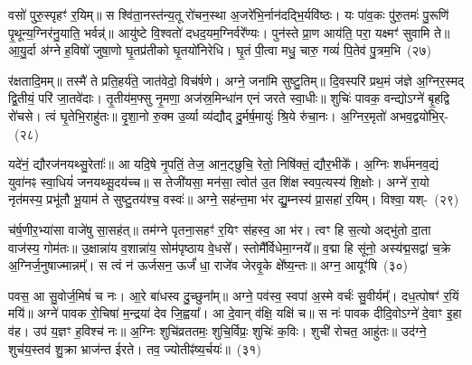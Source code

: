वसो॑ पुरु॒स्पृहꣳ॑ र॒यिम्॥ स श्वि॑ता॒नस्त॑न्य॒तू रो॑चन॒स्था अ॒जरे॑भि॒र्नान॑दद्भि॒र्यवि॑ष्ठः। यः पा॑व॒कः पु॑रु॒तमः॑ पु॒रूणि॑ पृ॒थून्य॒ग्निर॑नु॒याति॒ भर्वन्न्॑॥ आयु॑ष्टे वि॒श्वतो॑ दधद॒यम॒ग्निर्वरे᳚ण्यः। पुन॑स्ते प्रा॒ण आय॑ति॒ परा॒ यक्ष्मꣳ॑ सुवामि ते॥ आ॒यु॒र्दा अ॑ग्ने ह॒विषो॑ जुषा॒णो घृ॒तप्र॑तीको घृ॒तयो॑निरेधि। घृ॒तं पी॒त्वा मधु॒ चारु॒ गव्यं॑ पि॒तेव॑ पु॒त्रम॒भि~(२७)

र॑क्षतादि॒मम्॥ तस्मै॑ ते प्रति॒हर्य॑ते॒ जात॑वेदो॒ विच॑र्\mbox{}षणे। अग्ने॒ जना॑मि सुष्टु॒तिम्॥ दि॒वस्परि॑ प्रथ॒मं ज॑ज्ञे अ॒ग्निर॒स्मद् द्वि॒तीयं॒ परि॑ जा॒तवे॑दाः। तृ॒तीय॑म॒फ्सु नृ॒मणा॒ अज॑स्र॒मिन्धा॑न एनं जरते स्वा॒धीः॥ शुचिः॑ पावक॒ वन्द्यो\-ऽग्ने॑ बृ॒हद्वि रो॑चसे। त्वं घृ॒तेभि॒राहु॑तः॥ दृ॒शा॒नो रु॒क्म उ॒र्व्या व्य॑द्यौद् दु॒र्मर्\mbox{}ष॒मायुः॑ श्रि॒ये रु॑चा॒नः। अ॒ग्निर॒मृतो॑ अभव॒द्वयो॑भि॒र्-~(२८)

यदे॑नं॒ द्यौरज॑नयथ्सु॒रेताः᳚॥ आ यदि॒षे नृ॒पतिं॒ तेज॒ आन॒ट्छुचि॒ रेतो॒ निषि॑क्तं॒ द्यौर॒भीके᳚। अ॒ग्निः शर्ध॑मनव॒द्यं युवा॑नꣴ स्वा॒धियं॑ जनयथ्सू॒दय॑च्च॥ स तेजी॑यसा॒ मन॑सा॒ त्वोत॑ उ॒त शि॑क्ष स्वप॒त्यस्य॑ शि॒क्षोः। अग्ने॑ रा॒यो नृत॑मस्य॒ प्रभू॑तौ भू॒याम॑ ते सुष्टु॒तय॑श्च॒ वस्वः॑॥ अग्ने॒ सह॑न्त॒मा भ॑र द्यु॒म्नस्य॑ प्रा॒सहा॑ र॒यिम्। विश्वा॒ यश्-~(२९)

च॑र्\mbox{}ष॒णीर॒भ्या॑सा वाजे॑षु सा॒सह॑त्॥ तम॑ग्ने पृतना॒सहꣳ॑ र॒यिꣳ स॑हस्व॒ आ भ॑र। त्वꣳ हि स॒त्यो अद्भु॑तो दा॒ता वाज॑स्य॒ गोम॑तः॥ उ॒क्षान्ना॑य व॒शान्ना॑य॒ सोम॑पृष्ठाय वे॒धसे᳚। स्तोमै᳚र्विधेमा॒ग्नये᳚॥ व॒द्मा हि सू॑नो॒ अस्य॑द्म॒सद्वा॑ च॒क्रे अ॒ग्निर्ज॒नुषाज्मान्नम्᳚। स त्वं न॑ ऊर्जसन॒ ऊर्जं॑ धा॒ राजे॑व जेरवृ॒के क्षे᳚ष्य॒न्तः॥ अग्न॒ आयूꣳ॑षि~(३०)

पवस॒ आ सु॒वोर्ज॒मिषं॑ च नः। आ॒रे बा॑धस्व दु॒च्छुना᳚म्॥ अग्ने॒ पव॑स्व॒ स्वपा॑ अ॒स्मे वर्चः॑ सु॒वीर्यम्᳚। दध॒त्पोषꣳ॑ र॒यिं मयि॑॥ अग्ने॑ पावक रो॒चिषा॑ म॒न्द्रया॑ देव जि॒ह्वया᳚। आ दे॒वान् व॑क्षि॒ यक्षि॑ च॥ स नः॑ पावक दीदि॒वो\-ऽग्ने॑ दे॒वाꣳ इ॒हा व॑ह। उप॑ य॒ज्ञꣳ ह॒विश्च॑ नः॥ अ॒ग्निः शुचि॑व्रततमः॒ शुचि॒र्विप्रः॒ शुचिः॑ क॒विः। शुची॑ रोचत॒ आहु॑तः॥ उद॑ग्ने॒ शुच॑य॒स्तव॑ शु॒क्रा भ्राज॑न्त ईरते। तव॒ ज्योतीꣴ॑ष्य॒र्चयः॑॥~(३१)

{\anuvakamend[{पु॒रु॒नि॒ष्ठः पु॑र्वणीक भरा॒\-ऽभि वयो॑भि॒र्य आयूꣳ॑षि॒ विप्रः॒ शुचि॒श्चतु॑र्दश च}]}%

{}


